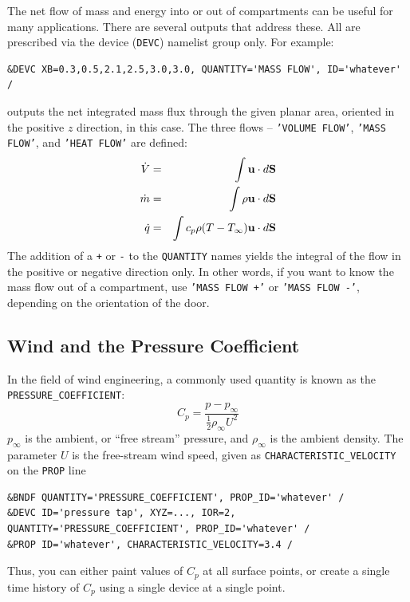\documentclass[11pt]{book}
\newcommand{\ct}{\tt\small}
\newcommand{\dS}{{d\bf S}}
\newcommand{\bu}{{\bf u}}
\newcommand{\ha}{\frac{1}{2}}
\newcommand{\be}{\begin{equation}}
\newcommand{\ee}{\end{equation}}
\begin{document}
The net flow of mass and energy into or out of compartments can be useful for many applications. There are several outputs that address these. All are prescribed via
the device ({\ct DEVC}) namelist group only. For example:

\footnotesize
\begin{verbatim}
&DEVC XB=0.3,0.5,2.1,2.5,3.0,3.0, QUANTITY='MASS FLOW', ID='whatever' /
\end{verbatim}
\normalsize

\noindent
outputs the net integrated mass flux through the given planar area, oriented in the positive $z$ direction, in this case. The three flows -- {\ct 'VOLUME FLOW'}, {\ct 'MASS FLOW'},
and {\ct 'HEAT FLOW'} are defined:
\begin{eqnarray*} \dot{V} &=& \int \bu \cdot \dS  \\
                  \dot{m} &=& \int \rho \bu \cdot \dS \\
                  \dot{q} &=& \int c_p \rho (T-T_\infty) \bu \cdot \dS  \end{eqnarray*}
The addition of a {\ct +} or {\ct -} to the {\ct QUANTITY} names yields the integral of the flow in the positive or negative direction only. In other words, if you want to know
the mass flow out of a compartment, use {\ct 'MASS FLOW +'} or {\ct 'MASS FLOW -'}, depending on the orientation of the door.


\subsection{Wind and the Pressure Coefficient}
\label{info:wind}

In the field of wind engineering, a commonly used quantity is known as the {\ct PRESSURE\_COEFFICIENT}:
\be
   C_p = \frac{p-p_\infty}{\ha \rho_\infty U^2}
\ee
$p_\infty$ is the ambient, or ``free stream'' pressure, and $\rho_\infty$ is the ambient density.
The parameter $U$ is the free-stream wind speed, given as {\ct CHARACTERISTIC\_VELOCITY} on the {\ct PROP} line

\footnotesize
\begin{verbatim}
&BNDF QUANTITY='PRESSURE_COEFFICIENT', PROP_ID='whatever' /
&DEVC ID='pressure tap', XYZ=..., IOR=2, QUANTITY='PRESSURE_COEFFICIENT', PROP_ID='whatever' /
&PROP ID='whatever', CHARACTERISTIC_VELOCITY=3.4 /
\end{verbatim}
\normalsize

\noindent
Thus, you can either paint values of $C_p$ at all surface points, or create a single time history of $C_p$ using a single device at a single point.
\end{document}
